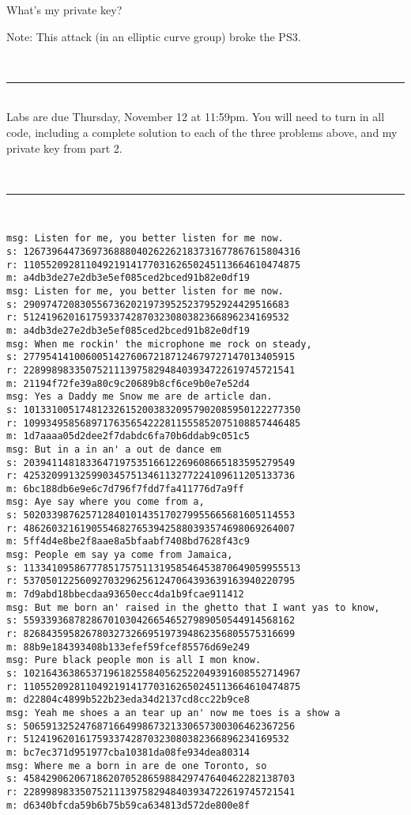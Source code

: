 \documentclass[11pt,oneside]{article}
\newcommand{\sectionfont}{phv} %
\renewcommand{\section}[1] {
    \vspace{12pt}{\quad\fontfamily{\sectionfont}\selectfont\Large\scshape\textbf{#1}}\\[-10pt]
    \vspace{8pt}\rule{\textwidth}{1pt}\\[-16pt]

}
\begin{document}
What's my private key?

Note: This attack (in an elliptic curve group) broke the PS3.

\section{Grading}

Labs are due Thursday, November 12 at 11:59pm. You will need to turn in
all code, including a complete solution to each of the three problems above, and
my private key from part 2.

\appendix
\section{Encrypted Messages for Part 2}
\begin{verbatim}
msg: Listen for me, you better listen for me now. 
s: 1267396447369736888040262262183731677867615804316
r: 1105520928110492191417703162650245113664610474875
m: a4db3de27e2db3e5ef085ced2bced91b82e0df19
msg: Listen for me, you better listen for me now. 
s: 29097472083055673620219739525237952924429516683
r: 51241962016175933742870323080382366896234169532
m: a4db3de27e2db3e5ef085ced2bced91b82e0df19
msg: When me rockin' the microphone me rock on steady, 
s: 277954141006005142760672187124679727147013405915
r: 228998983350752111397582948403934722619745721541
m: 21194f72fe39a80c9c20689b8cf6ce9b0e7e52d4
msg: Yes a Daddy me Snow me are de article dan. 
s: 1013310051748123261520038320957902085950122277350
r: 1099349585689717635654222811555852075108857446485
m: 1d7aaaa05d2dee2f7dabdc6fa70b6ddab9c051c5
msg: But in a in an' a out de dance em 
s: 203941148183364719753516612269608665183595279549
r: 425320991325990345751346113277224109611205133736
m: 6bc188db6e9e6c7d796f7fdd7fa411776d7a9ff
msg: Aye say where you come from a, 
s: 502033987625712840101435170279955665681605114553
r: 486260321619055468276539425880393574698069264007
m: 5ff4d4e8be2f8aae8a5bfaabf7408bd7628f43c9
msg: People em say ya come from Jamaica, 
s: 1133410958677785175751131958546453870649059955513
r: 537050122560927032962561247064393639163940220795
m: 7d9abd18bbecdaa93650ecc4da1b9fcae911412
msg: But me born an' raised in the ghetto that I want yas to know, 
s: 559339368782867010304266546527989050544914568162
r: 826843595826780327326695197394862356805575316699
m: 88b9e184393408b133efef59fcef85576d69e249
msg: Pure black people mon is all I mon know. 
s: 1021643638653719618255840562522049391608552714967
r: 1105520928110492191417703162650245113664610474875
m: d22804c4899b522b23eda34d2137cd8cc22b9ce8
msg: Yeah me shoes a an tear up an' now me toes is a show a 
s: 506591325247687166499867321330657300306462367256
r: 51241962016175933742870323080382366896234169532
m: bc7ec371d951977cba10381da08fe934dea80314
msg: Where me a born in are de one Toronto, so 
s: 458429062067186207052865988429747640462282138703
r: 228998983350752111397582948403934722619745721541
m: d6340bfcda59b6b75b59ca634813d572de800e8f
\end{verbatim}
\end{document}
